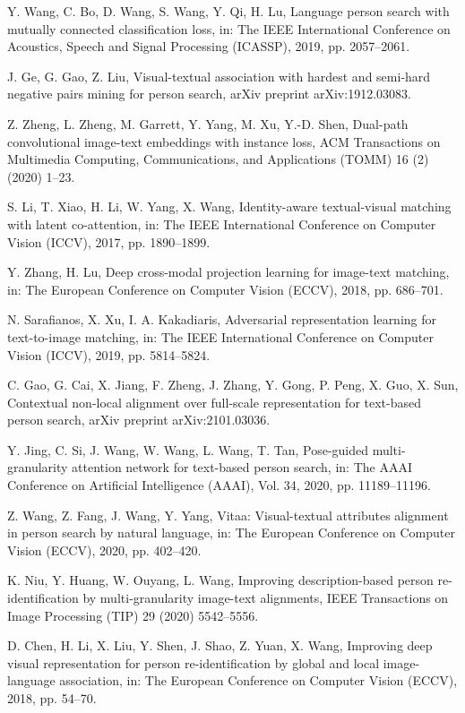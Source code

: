 \documentclass[review]{elsarticle}
\begin{document}
\begin{thebibliography}{1}
Y. Wang, C. Bo, D. Wang, S. Wang, Y. Qi, H. Lu, Language person search with mutually connected classification loss, in: The IEEE International Conference on Acoustics, Speech and Signal Processing (ICASSP), 2019, pp. 2057–2061.

J. Ge, G. Gao, Z. Liu, Visual-textual association with hardest and semi-hard negative pairs mining for person search, arXiv preprint arXiv:1912.03083.

Z. Zheng, L. Zheng, M. Garrett, Y. Yang, M. Xu, Y.-D. Shen, Dual-path convolutional image-text embeddings with instance loss, ACM Transactions
on Multimedia Computing, Communications, and Applications (TOMM) 16 (2) (2020) 1–23.

S. Li, T. Xiao, H. Li, W. Yang, X. Wang, Identity-aware textual-visual matching with latent co-attention, in: The IEEE International Conference
on Computer Vision (ICCV), 2017, pp. 1890–1899.

Y. Zhang, H. Lu, Deep cross-modal projection learning for image-text matching, in: The European Conference on Computer Vision (ECCV), 2018, pp. 686–701.

N. Sarafianos, X. Xu, I. A. Kakadiaris, Adversarial representation learning for text-to-image matching, in: The IEEE International Conference on Computer Vision (ICCV), 2019, pp. 5814–5824.

C. Gao, G. Cai, X. Jiang, F. Zheng, J. Zhang, Y. Gong, P. Peng, X. Guo, X. Sun, Contextual non-local alignment over full-scale representation for text-based person search, arXiv preprint arXiv:2101.03036.

Y. Jing, C. Si, J. Wang, W. Wang, L. Wang, T. Tan, Pose-guided multi-granularity attention network for text-based person search, in: The AAAI Conference on Artificial Intelligence (AAAI), Vol. 34, 2020, pp. 11189–11196.

Z. Wang, Z. Fang, J. Wang, Y. Yang, Vitaa: Visual-textual attributes alignment in person search by natural language, in: The European Conference on Computer Vision (ECCV), 2020, pp. 402–420.

K. Niu, Y. Huang, W. Ouyang, L. Wang, Improving description-based person re-identification by multi-granularity image-text alignments, IEEE Transactions on Image Processing (TIP) 29 (2020) 5542–5556.

D. Chen, H. Li, X. Liu, Y. Shen, J. Shao, Z. Yuan, X. Wang, Improving deep visual representation for person re-identification by global and local
image-language association, in: The European Conference on Computer Vision (ECCV), 2018, pp. 54–70.


\end{thebibliography}
\end{document}
